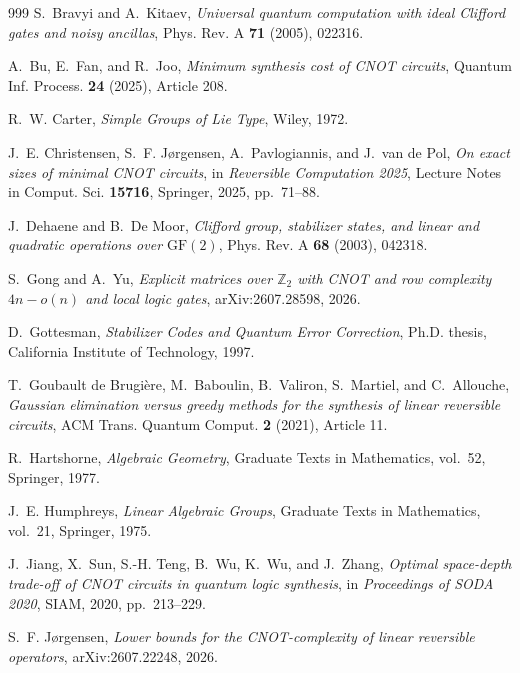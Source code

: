 \begin{thebibliography}{999}
S.~Bravyi and A.~Kitaev,
\emph{Universal quantum computation with ideal Clifford gates and noisy ancillas},
Phys. Rev. A \textbf{71} (2005), 022316.


A.~Bu, E.~Fan, and R.~Joo,
\emph{Minimum synthesis cost of CNOT circuits},
Quantum Inf. Process. \textbf{24} (2025), Article 208.


R.~W. Carter,
\emph{Simple Groups of Lie Type},
Wiley, 1972.


J.~E. Christensen, S.~F. J\o rgensen, A.~Pavlogiannis, and J.~van de Pol,
\emph{On exact sizes of minimal CNOT circuits},
in \emph{Reversible Computation 2025}, Lecture Notes in Comput. Sci. \textbf{15716}, Springer, 2025, pp.~71--88.


J.~Dehaene and B.~De Moor,
\emph{Clifford group, stabilizer states, and linear and quadratic operations over $\mathrm{GF}(2)$},
Phys. Rev. A \textbf{68} (2003), 042318.


S.~Gong and A.~Yu,
\emph{Explicit matrices over $\mathbb Z_2$ with CNOT and row complexity $4n-o(n)$ and local logic gates},
arXiv:2607.28598, 2026.


D.~Gottesman,
\emph{Stabilizer Codes and Quantum Error Correction},
Ph.D. thesis, California Institute of Technology, 1997.


T.~Goubault de Brugi\`ere, M.~Baboulin, B.~Valiron, S.~Martiel, and C.~Allouche,
\emph{Gaussian elimination versus greedy methods for the synthesis of linear reversible circuits},
ACM Trans. Quantum Comput. \textbf{2} (2021), Article 11.


R.~Hartshorne,
\emph{Algebraic Geometry},
Graduate Texts in Mathematics, vol.~52, Springer, 1977.


J.~E. Humphreys,
\emph{Linear Algebraic Groups},
Graduate Texts in Mathematics, vol.~21, Springer, 1975.


J.~Jiang, X.~Sun, S.-H. Teng, B.~Wu, K.~Wu, and J.~Zhang,
\emph{Optimal space-depth trade-off of CNOT circuits in quantum logic synthesis},
in \emph{Proceedings of SODA 2020}, SIAM, 2020, pp.~213--229.


S.~F. J\o rgensen,
\emph{Lower bounds for the CNOT-complexity of linear reversible operators},
arXiv:2607.22248, 2026.



\end{thebibliography}
